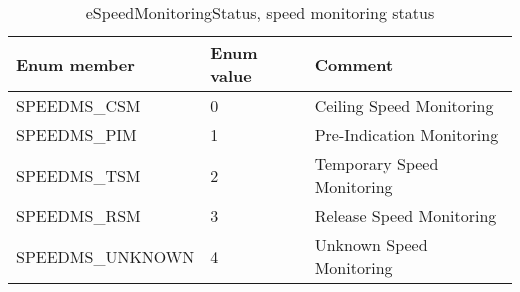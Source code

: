 \documentclass{template/openetcs_article}
\begin{document}
\begin{longtable}{|l|l|l|}
	\caption{eSpeedMonitoringStatus, speed monitoring status} \\ 
	\hline
		\begin{minipage}[t]{0.45\linewidth} \textbf{Enum member}	\end{minipage}
	&	\begin{minipage}[t]{0.10\linewidth} \textbf{Enum value}	\end{minipage} 
	&	\begin{minipage}[t]{0.50\linewidth} \textbf{Comment} \end{minipage} \\
	\hline
		\begin{minipage}[t]{0.45\linewidth} SPEEDMS\_CSM \end{minipage} 
	&	\begin{minipage}[t]{0.10\linewidth} 0 \end{minipage} 
	&	\begin{minipage}[t]{0.50\linewidth} Ceiling Speed Monitoring \end{minipage}\\
	\hline
		\begin{minipage}[t]{0.45\linewidth} SPEEDMS\_PIM \end{minipage} 
	&	\begin{minipage}[t]{0.10\linewidth} 1 \end{minipage} 
	&	\begin{minipage}[t]{0.50\linewidth} Pre-Indication Monitoring \end{minipage}\\
	\hline
		\begin{minipage}[t]{0.45\linewidth} SPEEDMS\_TSM \end{minipage} 
	&	\begin{minipage}[t]{0.10\linewidth} 2 \end{minipage} 
	&	\begin{minipage}[t]{0.50\linewidth} Temporary Speed Monitoring \end{minipage}\\
	\hline
		\begin{minipage}[t]{0.45\linewidth} SPEEDMS\_RSM \end{minipage} 
	&	\begin{minipage}[t]{0.10\linewidth} 3 \end{minipage} 
	&	\begin{minipage}[t]{0.50\linewidth} Release Speed Monitoring \end{minipage}\\
	\hline
		\begin{minipage}[t]{0.45\linewidth} SPEEDMS\_UNKNOWN \end{minipage} 
	&	\begin{minipage}[t]{0.10\linewidth} 4 \end{minipage} 
	&	\begin{minipage}[t]{0.50\linewidth} Unknown Speed Monitoring \end{minipage}\\
	\hline
\end{longtable}
\end{document}
